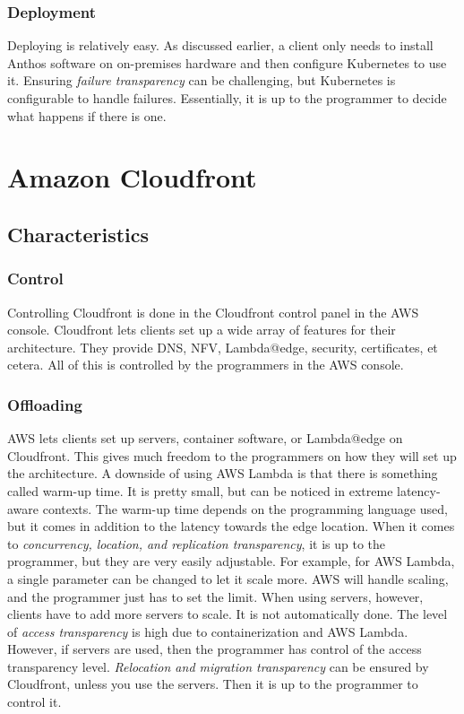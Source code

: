 \subsubsection{Deployment}
Deploying is relatively easy. As discussed earlier, a client only needs to install Anthos software on on-premises hardware and then configure Kubernetes to use it. Ensuring \textit{failure transparency} can be challenging, but Kubernetes is configurable to handle failures. Essentially, it is up to the programmer to decide what happens if there is one.












\section{Amazon Cloudfront}
\subsection{Characteristics}
\subsubsection{Control}
Controlling Cloudfront is done in the Cloudfront control panel in the AWS console. Cloudfront lets clients set up a wide array of features for their architecture. They provide DNS, NFV, Lambda@edge, security, certificates, et cetera. All of this is controlled by the programmers in the AWS console.  


\subsubsection{Offloading}
AWS lets clients set up servers, container software, or Lambda@edge on Cloudfront. This gives much freedom to the programmers on how they will set up the architecture. A downside of using AWS Lambda is that there is something called warm-up time. It is pretty small, but can be noticed in extreme latency-aware contexts. The warm-up time depends on the programming language used, but it comes in addition to the latency towards the edge location. When it comes to \textit{concurrency, location, and replication transparency}, it is up to the programmer, but they are very easily adjustable. For example, for AWS Lambda, a single parameter can be changed to let it scale more. AWS will handle scaling, and the programmer just has to set the limit. When using servers, however, clients have to add more servers to scale. It is not automatically done. The level of \textit{access transparency} is high due to containerization and AWS Lambda. However, if servers are used, then the programmer has control of the access transparency level. \textit{Relocation and migration transparency} can be ensured by Cloudfront, unless you use the servers. Then it is up to the programmer to control it. 


